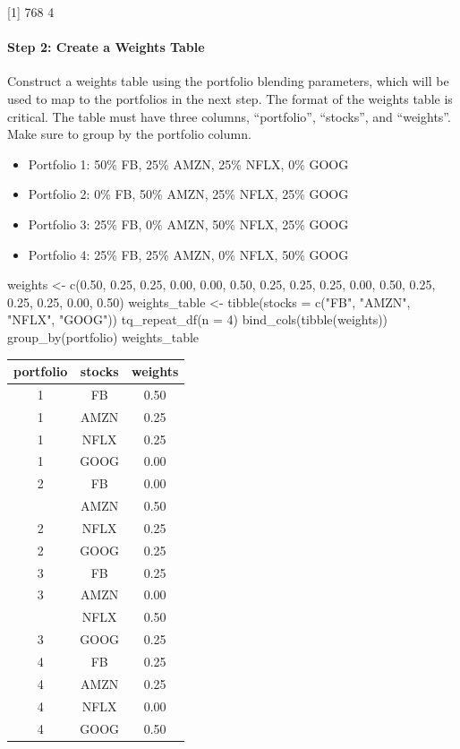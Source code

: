 {[}1{]} 768 4

\hspace{20 mm}

\paragraph{Step 2: Create a Weights
Table}\label{step-2-create-a-weights-table}

Construct a weights table using the portfolio blending parameters, which
will be used to map to the portfolios in the next step. The format of
the weights table is critical. The table must have three columns,
``portfolio'', ``stocks'', and ``weights''. Make sure to group by the
portfolio column.

\begin{itemize}
\tightlist
\item
  Portfolio 1: 50\% FB, 25\% AMZN, 25\% NFLX, 0\% GOOG
\item
  Portfolio 2: 0\% FB, 50\% AMZN, 25\% NFLX, 25\% GOOG
\item
  Portfolio 3: 25\% FB, 0\% AMZN, 50\% NFLX, 25\% GOOG
\item
  Portfolio 4: 25\% FB, 25\% AMZN, 0\% NFLX, 50\% GOOG
\end{itemize}

\begin{Schunk}
\begin{Sinput}
weights <- c(0.50, 0.25, 0.25, 0.00,
             0.00, 0.50, 0.25, 0.25,
             0.25, 0.00, 0.50, 0.25, 
             0.25, 0.25, 0.00, 0.50)
weights_table <- tibble(stocks = c("FB", "AMZN", "NFLX", "GOOG")) %
    tq_repeat_df(n = 4) %
    bind_cols(tibble(weights)) %
    group_by(portfolio)
weights_table
\end{Sinput}
\end{Schunk}

\begin{tabular}{ccc}
\toprule
portfolio & stocks & weights\\
\midrule
1 & FB & 0.50\\
1 & AMZN & 0.25\\
1 & NFLX & 0.25\\
1 & GOOG & 0.00\\
2 & FB & 0.00\\
\addlinespace
2 & AMZN & 0.50\\
2 & NFLX & 0.25\\
2 & GOOG & 0.25\\
3 & FB & 0.25\\
3 & AMZN & 0.00\\
\addlinespace
3 & NFLX & 0.50\\
3 & GOOG & 0.25\\
4 & FB & 0.25\\
4 & AMZN & 0.25\\
4 & NFLX & 0.00\\
4 & GOOG & 0.50\\
\bottomrule
\end{tabular}

